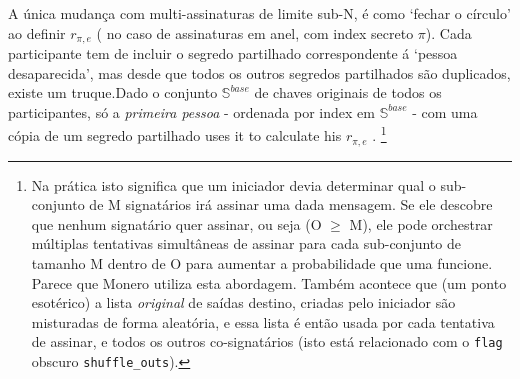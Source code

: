 A única mudança com multi-assinaturas de limite sub-N, é como `fechar o círculo' ao definir $r_{\pi,e}$ ( no caso de assinaturas em anel, com index secreto $\pi$). 
Cada participante tem de incluir o segredo partilhado correspondente á `pessoa desaparecida', mas desde que todos os outros segredos partilhados são duplicados, existe um truque.\newline Dado o conjunto $\mathbb{S}^{base}$ de chaves originais de todos os participantes, só a {\em primeira pessoa} - ordenada por index em $\mathbb{S}^{base}$ - com uma cópia de um segredo partilhado uses it to calculate his $r_{\pi,e}$ .        
\footnote{Na prática isto significa que um iniciador devia determinar qual o sub-conjunto de M signatários irá assinar uma dada mensagem. Se ele descobre que nenhum signatário quer assinar, ou seja (O $\geq$ M), ele pode orchestrar múltiplas tentativas simultâneas de assinar para cada sub-conjunto de tamanho M dentro de O para aumentar a probabilidade que uma funcione. Parece que Monero utiliza esta abordagem. Também acontece que (um ponto esotérico) a lista {\em original} de saídas destino, criadas pelo iniciador são misturadas de forma aleatória, e essa lista é então usada por cada tentativa de assinar, e todos os outros co-signatários (isto está relacionado com o {\tt flag} obscuro {\tt shuffle\_outs}).}    
